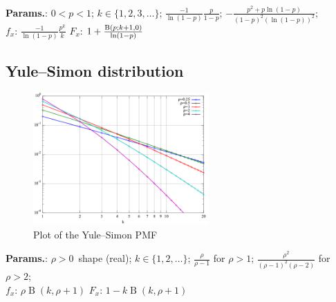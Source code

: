     {\color{darkblue} \textbf{Params.}:} {$0 < p < 1$}; {$k \in \{1,2,3,\ldots\}$}; {$\frac{-1}{\ln(1-p)} \frac{p}{1-p}$}; {$- \frac{p^2 + p\ln(1-p)}{(1-p)^2(\ln(1-p))^2}$};\hspace{0.5cm}\\{\color{darkblue} \textbf{$f_x$}:} {$\frac{-1}{\ln(1-p)} \frac{p^k}{k}$}{\color{darkblue} \textbf{$F_x$}:} {$1 + \frac{\mathrm{B}(p;k+1,0)}{\ln(1-p)}$}



    
        
\subsection{Yule–Simon distribution}


    \begin{figure}[H]
        \centering
        \includegraphics[width=0.6\textwidth]{images/Yule-Simon distribution PMF.png}
        \caption{Plot of the Yule–Simon PMF}
    \end{figure}




    {\color{darkblue} \textbf{Params.}:} {$\rho>0\,$ shape (real)}; {$k \in \{1,2,\dotsc\}$}; {$\frac \rho {\rho-1}$ for $\rho>1$}; {$\frac{\rho^2}{(\rho-1)^2(\rho-2)}$ for $\rho>2$};\hspace{0.5cm}\\{\color{darkblue} \textbf{$f_x$}:} {$\rho\operatorname{B}(k, \rho+1)$}{\color{darkblue} \textbf{$F_x$}:} {$1 - k\operatorname{B}(k, \rho+1)$}



